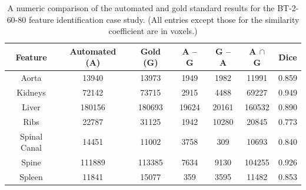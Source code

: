\begin{table}[p]
\begin{center}
\begin{tabular}{c|cccccc}
\footnotesize \textbf{Feature} & \footnotesize \textbf{Automated (A)} & \footnotesize \textbf{Gold (G)} & \footnotesize \textbf{A -- G} & \footnotesize \textbf{G -- A} & \footnotesize \textbf{A $\cap$ G} & \footnotesize \textbf{Dice} \\
\hline
\footnotesize Aorta & \footnotesize 13940 & \footnotesize 13973 & \footnotesize 1949 & \footnotesize 1982 & \footnotesize 11991 & \footnotesize 0.859 \\
\footnotesize Kidneys & \footnotesize 72142 & \footnotesize 73715 & \footnotesize 2915 & \footnotesize 4488 & \footnotesize 69227 & \footnotesize 0.949 \\
\footnotesize Liver & \footnotesize 180156 & \footnotesize 180693 & \footnotesize 19624 & \footnotesize 20161 & \footnotesize 160532 & \footnotesize 0.890 \\
\footnotesize Ribs & \footnotesize 22787 & \footnotesize 31125 & \footnotesize 1942 & \footnotesize 10280 & \footnotesize 20845 & \footnotesize 0.773 \\
\footnotesize Spinal Canal & \footnotesize 14451 & \footnotesize 11002 & \footnotesize 3758 & \footnotesize 309 & \footnotesize 10693 & \footnotesize 0.840 \\
\footnotesize Spine & \footnotesize 111889 & \footnotesize 113385 & \footnotesize 7634 & \footnotesize 9130 & \footnotesize 104255 & \footnotesize 0.926 \\
\footnotesize Spleen & \footnotesize 11841 & \footnotesize 15077 & \footnotesize 359 & \footnotesize 3595 & \footnotesize 11482 & \footnotesize 0.853 \\
\end{tabular}
\end{center}
\caption{A numeric comparison of the automated and gold standard results for the BT-2-60-80 feature identification case study. (All entries except those for the similarity coefficient are in voxels.)}
\label{tbl:validation-BT-2-60-80}
\end{table}

